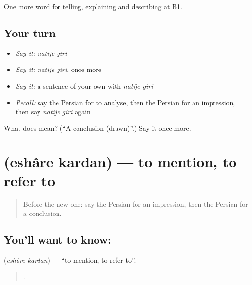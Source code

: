 \begin{grammarlens}[title={What you've built}]
One more word for telling, explaining and describing at B1.
\end{grammarlens}

\subsection*{Your turn}
\begin{itemize}
\raggedright
  \item \emph{Say it:} \emph{natije giri}
  \item \emph{Say it:} \emph{natije giri}, once more
  \item \emph{Say it:} a sentence of your own with \emph{natije giri}
  \item \emph{Recall:} say the Persian for to analyse, then the Persian for an impression, then say \emph{natije giri} again
\end{itemize}

\begin{tcolorbox}[breakable,colback=teal!4,colframe=teal!35!black,title={Before you move on}]
What does   mean? (\textquotedblleft{}A conclusion (drawn)\textquotedblright{}.) Say it once more.
\end{tcolorbox}
\section[\texorpdfstring{\fa{اشاره} \fa{کردن} (eshâre kardan)}{اشاره کردن (eshâre kardan)}]{  (eshâre kardan) — to mention, to refer to}

\label{lesson:FA-C368-eshare-kardan}



\begin{quote}
Before the new one: say the Persian for an impression, then the Persian for a conclusion.
\end{quote}

\subsection*{You'll want to know:  }
\textbf{ } (\emph{eshâre kardan}) — \textquotedblleft{}to mention, to refer to\textquotedblright{}.

\begin{quote}
       .
\end{quote}


